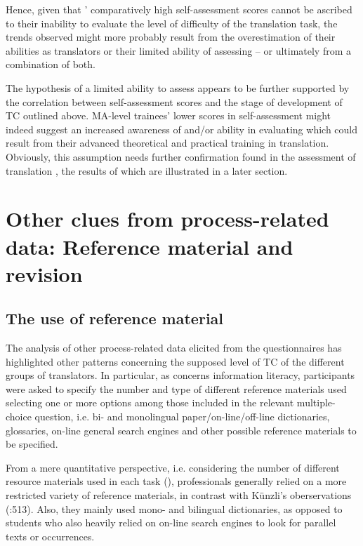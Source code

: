 \documentclass[output=paper]{LSP/langsci}
\begin{document}
Hence, given that ' comparatively high self-assessment scores cannot be ascribed to their inability to evaluate the level of difficulty of the translation task, the trends observed might more probably result from the overestimation of their abilities as translators or their limited ability of assessing  -- or ultimately from a combination of both.

The hypothesis of a limited ability to assess  appears to be further supported by the correlation between self-assessment scores and the stage of development of TC outlined above. MA-level trainees' lower scores in self-assessment might indeed suggest an increased awareness of and/or ability in evaluating  which could result from their advanced theoretical and practical training in translation. Obviously, this assumption needs further confirmation found in the assessment of translation , the results of which are illustrated in a later section.

\section{Other clues from process-related data: Reference material and revision}

\subsection{The use of reference material}

The analysis of other process-related data elicited from the questionnaires has highlighted other patterns concerning the supposed level of TC of the different groups of translators. In particular, as concerns information literacy, participants were asked to specify the number and type of different reference materials used selecting one or more options among those included in the relevant multiple-choice question, i.e. bi- and monolingual paper/on-line/off-line dictionaries, glossaries, on-line general search engines and other possible reference materials to be specified.

From a mere quantitative perspective, i.e. considering the number of different resource materials used in each task (), professionals generally relied on a more restricted variety of reference materials, in contrast with Künzli's oberservations (\citeyear{Kunzli2001}:513). Also, they mainly used mono- and bilingual dictionaries, as opposed to students who also heavily relied on on-line search engines to look for parallel texts or occurrences.
\end{document}
